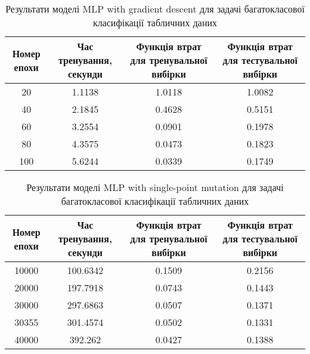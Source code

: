 \begin{table}[ht]
	\caption{Результати моделі MLP with gradient descent для задачі багатокласової класифікації табличних даних}
	\label{mlp_gd_mc_td_results}
	\centering
	\begin{adjustbox}{max width=\textwidth}
		\begin{tabular}{|c|c|c|c|}
			\hline 
			Номер епохи & Час тренування, секунди & Функція втрат для тренувальної вибірки & Функція втрат для тестувальної вибірки \\
			\hline 
			20 & 1.1138 & 1.0118 & 1.0082\\
			\hline 
			40 & 2.1845 & 0.4628 & 0.5151 \\
			\hline
			60 & 3.2554 & 0.0901 & 0.1978 \\
			\hline
			80 & 4.3575 & 0.0473 & 0.1823 \\
			\hline
			100 & 5.6244 & 0.0339 & 0.1749 \\
			\hline
		\end{tabular}
	\end{adjustbox}
\end{table}

\begin{table}[ht]
	\caption{Результати моделі MLP with single-point mutation для задачі багатокласової класифікації табличних даних}
	\label{mlp_spm_mc_td_results}
	\centering
	\begin{adjustbox}{max width=\textwidth}
		\begin{tabular}{|c|c|c|c|}
			\hline 
			Номер епохи & Час тренування, секунди & Функція втрат для тренувальної вибірки & Функція втрат для тестувальної вибірки \\
			\hline 
			10000 & 100.6342 & 0.1509 & 0.2156 \\
			\hline 
			20000 & 197.7918 & 0.0743 & 0.1443 \\
			\hline
			30000 & 297.6863 & 0.0507 & 0.1371 \\
			\hline
			30355 & 301.4574 & 0.0502 & 0.1331 \\
			\hline
			40000 & 392.262 & 0.0427 & 0.1388 \\
			\hline
		\end{tabular}
	\end{adjustbox}
\end{table}

